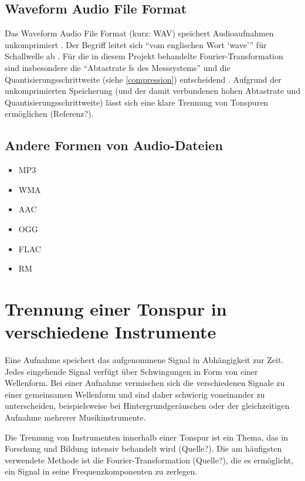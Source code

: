 %
\subsection{Waveform Audio File Format}
%

Das Waveform Audio File Format (kurz: WAV) speichert Audioaufnahmen unkomprimiert \parencite{what_is_a_wav_file}. Der Begriff leitet sich \enquote{vom englischen Wort \enquote{wave}} für Schallwelle ab \parencite{wav}. Für die in diesem Projekt behandelte Fourier-Transformation sind insbesondere die \enquote{Abtastrate fs des Messsystems} und die Quantisierungsschrittweite (siehe \cref{compression}) entscheidend  \parencite{FFT_grundlagen}. Aufgrund der unkomprimierten Speicherung (und der damit verbundenen hohen Abtastrate und Quantisierungsschrittweite) lässt sich eine klare Trennung von Tonspuren ermöglichen (Referenz?).


%
\subsection{Andere Formen von Audio-Dateien}
\label{audio_representations}
%

%
\begin{itemize}
    \item MP3
    \item WMA
    \item AAC
    \item OGG
    \item FLAC
    \item RM
\end{itemize}
%

\parencite{audioformate_im_überblick}

%
\section{Trennung einer Tonspur in verschiedene Instrumente}
%

Eine Aufnahme speichert das aufgenommene Signal in Abhängigkeit zur Zeit. Jedes eingehende Signal verfügt über Schwingungen in Form von einer Wellenform. Bei einer Aufnahme vermischen sich die verschiedenen Signale zu einer gemeinsamen Wellenform und sind daher schwierig voneinander zu unterscheiden, beispielsweise bei Hintergrundgeräuschen oder der gleichzeitigen Aufnahme mehrerer Musikinstrumente.

\par

Die Trennung von Instrumenten innerhalb einer Tonspur ist ein Thema, das in Forschung und Bildung intensiv behandelt wird (Quelle?). Die am häufigsten verwendete Methode ist die Fourier-Transformation (Quelle?), die es ermöglicht, ein Signal in seine Frequenzkomponenten zu zerlegen.

